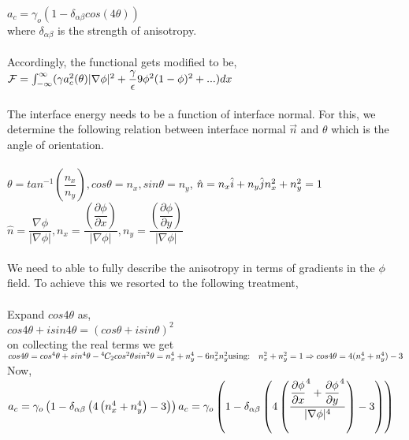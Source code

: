 \documentclass[12pt,a4paper]{report}
\newcommand*{\permcomb}[4][0mu]{{{}^{#3}\mkern#1#2_{#4}}}
\newcommand*{\comb}[1][-1mu]{\permcomb[#1]{C}}
\begin{document}
$a_c = \gamma_o\left(1 - \delta_{\alpha\beta}cos(4\theta)\right)$\\
where $\delta_{\alpha\beta}$ is the strength of anisotropy.\\
\\
Accordingly, the functional gets modified to be,\\
${\cal F} = \int_{-\infty}^{\infty}(\gamma a_c^2(\theta)|\nabla\phi|^2 + \dfrac{\gamma}{\epsilon}9\phi^2(1-\phi)^2 + ...)dx$\\
\\
The interface energy needs to be a function of interface normal. For this, we determine the 
following relation between interface normal $\vec{n}$ and $\theta$ which is the angle of orientation.\\
\\
$\theta = tan^{-1}\left(\dfrac{n_x}{n_y}\right), cos\theta = n_x, sin\theta = n_y$, 
$\hat{n} = n_x\hat{i} + n_y\hat{j}\\ n_x^2 + n_y^2 = 1$\\
$\hat{n} = \dfrac{\nabla\phi}{|\nabla\phi|}, 
n_x = \dfrac{\left(\dfrac{\partial\phi}{\partial x}\right)}{|\nabla\phi|},
n_y = \dfrac{\left(\dfrac{\partial\phi}{\partial y}\right)}{|\nabla\phi|}$\\
\\
We need to able to fully describe the anisotropy in terms of gradients in the 
$\phi$ field. To achieve this we resorted to the following treatment,\\
\\
Expand $cos 4\theta$ as,\\
$cos 4\theta + i sin 4\theta = (cos\theta + i sin\theta)^2$ \\
on collecting the real terms we get\\
$cos 4\theta = cos^4 \theta + sin^4 \theta - \comb{4}{2} cos^2 \theta sin^2 \theta\\ 
= n_x^4 + n_y^4 - 6 n_x^2 n_y^2\\
\\
\text{using:} \quad n_x^2 + n_y^2 = 1\\
\Rightarrow cos 4\theta = 4(n_x^4 + n_y^4) - 3
$\\
Now, $a_c = \gamma_o\left(1 - \delta_{\alpha\beta}\left(4\left(n_x^4 + n_y^4\right) - 3\right)\right)\\
\\
a_c = \gamma_o\left(1 - \delta_{\alpha\beta}\left(4\left(\dfrac{\dfrac{\partial\phi}{\partial x}^4 + \dfrac{\partial\phi}{\partial y}^4}{|\nabla\phi|^4}\right)
 - 3\right)\right)$\\
\end{document}
